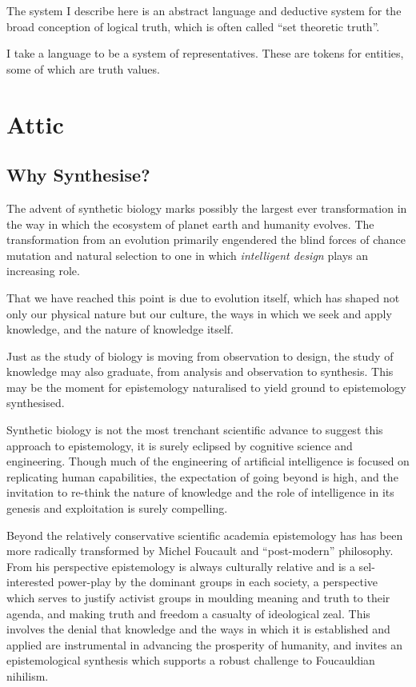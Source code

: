 \documentclass[10pt,titlepage]{book}
\begin{document}
The system I describe here is an abstract language and deductive system for the broad conception of logical truth, which is often called ``set theoretic truth''.

I take a language to be a system of representatives.
These are tokens for entities, some of which are truth values.





\chapter{Attic}

\section{Why Synthesise?}

The advent of synthetic biology marks possibly the largest ever transformation in the way in which the ecosystem of planet earth and humanity evolves.
The transformation from an evolution primarily engendered the blind forces of chance mutation and natural selection to one in which \emph{intelligent design} plays an increasing role.

That we have reached this point is due to evolution itself, which has shaped not only our physical nature but our culture, the ways in which we seek and apply knowledge, and the nature of knowledge itself.

Just as the study of biology is moving from observation to design, the study of knowledge may also graduate, from analysis and observation to synthesis.
This may be the moment for epistemology naturalised to yield ground to epistemology synthesised.

Synthetic biology is not the most trenchant scientific advance to suggest this approach to epistemology, it is surely eclipsed by cognitive science and engineering.
Though much of the engineering of artificial intelligence is focused on replicating human capabilities, the expectation of going beyond is high, and the invitation to re-think the nature of knowledge and the role of intelligence in its genesis and exploitation is surely compelling.

Beyond the relatively conservative scientific academia epistemology has has been more radically transformed by Michel Foucault and ``post-modern'' philosophy.
From his perspective epistemology is always culturally relative and is a sel-interested power-play by the dominant groups in each society, a perspective which serves to justify activist groups in moulding meaning and truth to their agenda, and making truth and freedom a casualty of ideological zeal.
This involves the denial that knowledge and the ways in which it is established and applied are instrumental in advancing the prosperity of humanity, and invites an epistemological synthesis which supports a robust challenge to Foucauldian nihilism.
\end{document}
